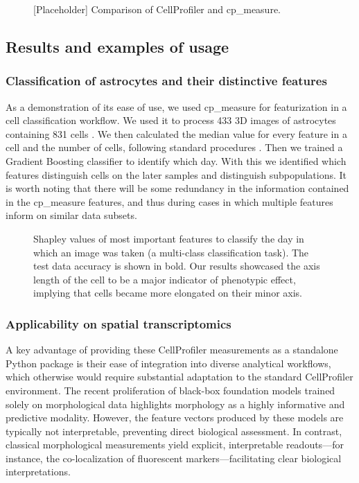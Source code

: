 \documentclass{article}
\begin{document}
\begin{figure}[htbp]
\centering

\caption{\label{fig:org7fe862f}{[}Placeholder] Comparison of CellProfiler and cp\_measure.}
\end{figure}
\subsection{Results and examples of usage}
\label{sec:org8ef524e}
\subsubsection{Classification of astrocytes and their distinctive features}
\label{sec:org3d97e6f}

As a demonstration of its ease of use, we used cp\_measure for featurization in a cell classification workflow. We used it to process 433 3D images of astrocytes containing 831 cells \citep{kalinin3DCellNuclear2018}. We then calculated the median value for every feature in a cell and the number of cells, following standard procedures \citep{caicedoDataanalysisStrategiesImagebased2017}. Then we trained a Gradient Boosting classifier to identify which day. With this we identified which features distinguish cells on the later samples and distinguish subpopulations. It is worth noting that there will be some redundancy in the information contained in the cp\_measure features, and thus during cases in which multiple features inform on similar data subsets.

\begin{figure}[htbp]
\centering

\caption{\label{fig:org4620d4d}Shapley values of most important features to classify the day in which an image was taken (a multi-class classification task). The test data accuracy is shown in bold. Our results showcased the axis length of the cell to be a major indicator of phenotypic effect, implying that cells became more elongated on their minor axis.}
\end{figure}
\subsubsection{Applicability on spatial transcriptomics}
\label{sec:org1d0d8b8}
A key advantage of providing these CellProfiler measurements as a standalone Python package is their ease of integration into diverse analytical workflows, which otherwise would require substantial adaptation to the standard CellProfiler environment. The recent proliferation of black-box foundation models trained solely on morphological data highlights morphology as a highly informative and predictive modality. However, the feature vectors produced by these models are typically not interpretable, preventing direct biological assessment. In contrast, classical morphological measurements yield explicit, interpretable readouts—for instance, the co-localization of fluorescent markers—facilitating clear biological interpretations.
\end{document}
